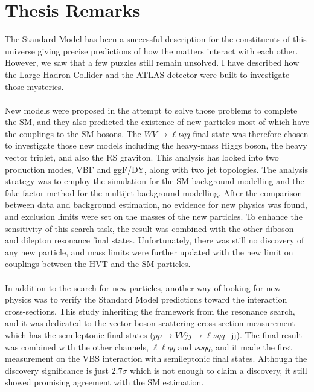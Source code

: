 \chapter{Thesis Remarks}
The Standard Model has been a successful description for the constituents of this universe giving precise predictions of how the matters interact with each other. However, we saw that a few puzzles still remain unsolved. I have described how the Large Hadron Collider and the ATLAS detector were built to investigate those mysteries.
\\
\\New models were proposed in the attempt to solve those problems to complete the SM, and they also predicted the existence of new particles most of which have the couplings to the SM bosons. The $WV\to \ell\nu qq$ final state was therefore chosen to investigate those new models including the heavy-mass Higgs boson, the heavy vector triplet, and also the RS graviton. This analysis has looked into two production modes, VBF and ggF/DY, along with two jet topologies. The analysis strategy was to employ the simulation for the SM background modelling and the fake factor method for the multijet background modelling. After the comparison between data and background estimation, no evidence for new physics was found, and exclusion limits were set on the masses of the new particles. To enhance the sensitivity of this search task, the result was combined with the other diboson and dilepton resonance final states. Unfortunately, there was still no discovery of any new particle, and mass limits were further updated with the new limit on couplings between the HVT and the SM particles. 
\\
\\In addition to the search for new particles, another way of looking for new physics was to verify the Standard Model predictions toward the interaction cross-sections. This study inheriting the framework from the resonance search, and it was dedicated to the vector boson scattering cross-section measurement which has the semileptonic final states ($pp\to VVjj \to \ell\nu qq$+jj). The final result was combined with the other channels, $\ell\ell qq$ and $\nu\nu qq$, and it made the first measurement on the VBS interaction with semileptonic final states. Although the discovery significance is just $2.7\sigma$ which is not enough to claim a discovery, it still showed promising agreement with the SM estimation. 
\\
